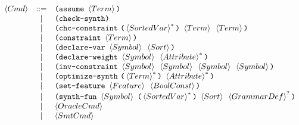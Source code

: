 \documentclass[english,a4paper,10pt]{article}
\begin{document}
\[
\begin{array}{rcl}
\cmd 
 & ::= & \paren{\assumekwd\mbox{ }\term} \\
 & | & \paren{\checksynthkwd} \\
 & | & \paren{\constraintchckwd\mbox{ }\paren{\kstar{\sortedvar}}\mbox{ }\term\mbox{ }\term} \\
 & | & \paren{\constraintkwd\mbox{ }\term} \\
 & | & \paren{\vardeclkwd\mbox{ }\symbol\mbox{ }\sortexpr}\\ 
 & | & \paren{\weightdeclkwd\mbox{ }\symbol\mbox{ }\kstar{\attribute}} \\
 & | & \paren{\constraintinvkwd\mbox{ }\symbol\mbox{ }\symbol\mbox{ }\symbol\mbox{ }\symbol} \\
 & | & \paren{\optsynthkwd\mbox{ }\paren{\kstar{\term}}\mbox{ }\kstar{\attribute}} \\
 & | & \paren{\setfeaturekwd\mbox{ }\feature\mbox{ }\boolconst} \\
 & | & \paren{\synthfunkwd\mbox{ }\symbol\mbox{ }\paren{\kstar{\sortedvar}}\mbox{ }\sortexpr\mbox{ }\koption{\grammardef}}\\
 & | & \oraclecmd \\
 & | & \smtcmd \\[2ex]


\end{array}\]
\end{document}
